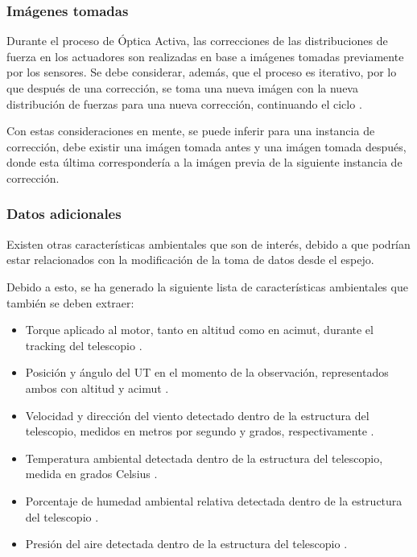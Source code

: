 \subsubsection{Imágenes tomadas}

Durante el proceso de Óptica Activa, las correcciones de las distribuciones de fuerza en los actuadores son realizadas en base a imágenes tomadas previamente por los sensores. Se debe considerar, además, que el proceso es iterativo, por lo que después de una corrección, se toma una nueva imágen con la nueva distribución de fuerzas para una nueva corrección, continuando el ciclo \cite{eso1998vlt}.

Con estas consideraciones en mente, se puede inferir para una instancia de corrección, debe existir una imágen tomada antes y una imágen tomada después, donde esta última correspondería a la imágen previa de la siguiente instancia de corrección.

\subsubsection{Datos adicionales}

Existen otras características ambientales que son de interés, debido a que  podrían estar relacionados con la modificación de la toma de datos desde el espejo.

Debido a esto, se ha generado la siguiente lista de características ambientales que también se deben extraer:

\begin{itemize}
    \item Torque aplicado al motor, tanto en altitud como en acimut, durante el tracking del telescopio \cite{eso1998vlt}.

    \item Posición y ángulo del UT en el momento de la observación, representados ambos con altitud y acimut \cite{eso1998vlt}.

    \item Velocidad y dirección del viento detectado dentro de la estructura del telescopio, medidos en metros por segundo y grados, respectivamente \cite{eso1998vlt}.

    \item Temperatura ambiental detectada dentro de la estructura del telescopio, medida en grados Celsius \cite{eso1998vlt}.

    \item Porcentaje de humedad ambiental relativa detectada dentro de la estructura del telescopio \cite{eso1998vlt}.

    \item Presión del aire detectada dentro de la estructura del telescopio \cite{eso1998vlt}.    
\end{itemize}

